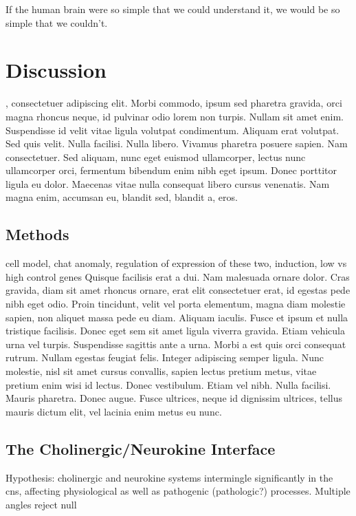 \begin{savequote}[75mm]
If the human brain were so simple that we could understand it, we would be so simple that we couldn’t.
\end{savequote}

\chapter{Discussion}

, consectetuer adipiscing elit. Morbi commodo, ipsum sed pharetra gravida, orci magna rhoncus neque, id pulvinar odio lorem non turpis. Nullam sit amet enim. Suspendisse id velit vitae ligula volutpat condimentum. Aliquam erat volutpat. Sed quis velit. Nulla facilisi. Nulla libero. Vivamus pharetra posuere sapien. Nam consectetuer. Sed aliquam, nunc eget euismod ullamcorper, lectus nunc ullamcorper orci, fermentum bibendum enim nibh eget ipsum. Donec porttitor ligula eu dolor. Maecenas vitae nulla consequat libero cursus venenatis. Nam magna enim, accumsan eu, blandit sed, blandit a, eros.

\section{Methods} \label{sec:discussion:methods}
cell model, chat anomaly, regulation of expression of these two, induction, low vs high control genes
Quisque facilisis erat a dui. Nam malesuada ornare dolor. Cras gravida, diam sit amet rhoncus ornare, erat elit consectetuer erat, id egestas pede nibh eget odio. Proin tincidunt, velit vel porta elementum, magna diam molestie sapien, non aliquet massa pede eu diam. Aliquam iaculis. Fusce et ipsum et nulla tristique facilisis. Donec eget sem sit amet ligula viverra gravida. Etiam vehicula urna vel turpis. Suspendisse sagittis ante a urna. Morbi a est quis orci consequat rutrum. Nullam egestas feugiat felis. Integer adipiscing semper ligula. Nunc molestie, nisl sit amet cursus convallis, sapien lectus pretium metus, vitae pretium enim wisi id lectus. Donec vestibulum. Etiam vel nibh. Nulla facilisi. Mauris pharetra. Donec augue. Fusce ultrices, neque id dignissim ultrices, tellus mauris dictum elit, vel lacinia enim metus eu nunc.

\section{The Cholinergic/Neurokine Interface}
Hypothesis: cholinergic and neurokine systems intermingle significantly in the cns, affecting physiological as well as pathogenic (pathologic?) processes. Multiple angles reject null

